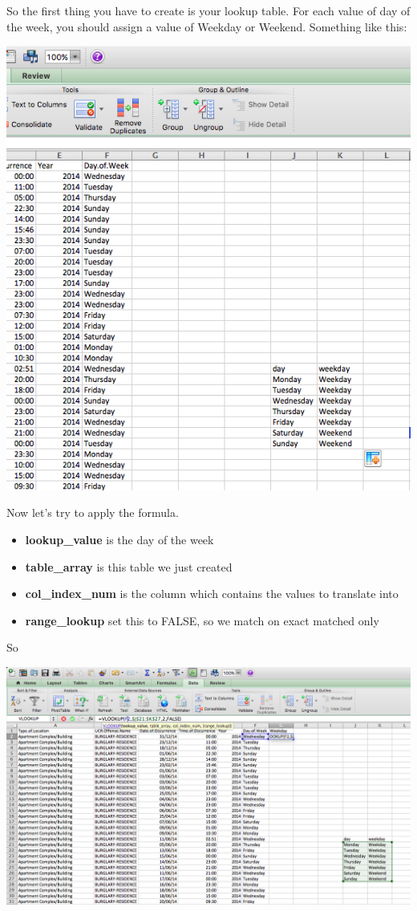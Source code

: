 \documentclass[]{book}
\providecommand{\tightlist}{%
  \setlength{\itemsep}{0pt}\setlength{\parskip}{0pt}}
\theoremstyle{definition}
\theoremstyle{definition}
\theoremstyle{definition}
\theoremstyle{remark}
\begin{document}
So the first thing you have to create is your lookup table. For each
value of day of the week, you should assign a value of Weekday or
Weekend. Something like this:

\includegraphics{imgs/wkday_lookup.png}

Now let's try to apply the formula.

\begin{itemize}
\tightlist
\item
  \textbf{lookup\_value} is the day of the week
\item
  \textbf{table\_array} is this table we just created
\item
  \textbf{col\_index\_num} is the column which contains the values to
  translate into
\item
  \textbf{range\_lookup} set this to FALSE, so we match on exact matched
  only
\end{itemize}

So

\includegraphics{imgs/vlookup_formula_wkday.png}
\end{document}
